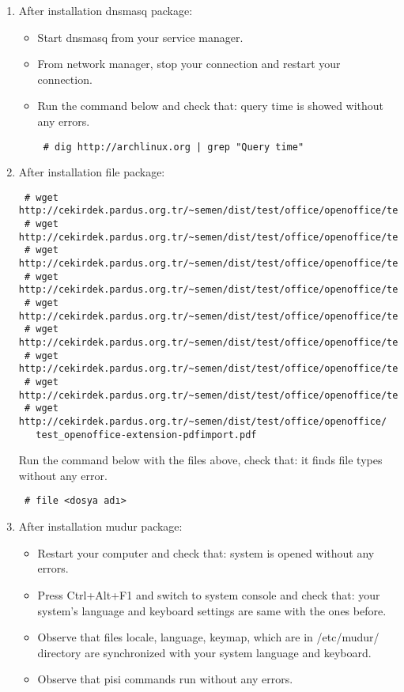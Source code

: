 \documentclass[a4paper,10pt]{article}
\begin{document}
\begin{enumerate}
\item After installation  dnsmasq package:

\begin{itemize}
 \item Start dnsmasq from your service manager.
 \item From network manager, stop your connection and restart your connection.
 \item Run the command below and  check that: query time is showed without any errors.
\begin{verbatim}
 # dig http://archlinux.org | grep "Query time"
\end{verbatim}

\end{itemize}


\item After installation  file package:

\begin{verbatim}
 # wget http://cekirdek.pardus.org.tr/~semen/dist/test/office/openoffice/test_oodraw.mng
 # wget http://cekirdek.pardus.org.tr/~semen/dist/test/office/openoffice/test_oodraw.odg
 # wget http://cekirdek.pardus.org.tr/~semen/dist/test/office/openoffice/test_oodraw.jpg
 # wget http://cekirdek.pardus.org.tr/~semen/dist/test/office/openoffice/test_oodraw.gif
 # wget http://cekirdek.pardus.org.tr/~semen/dist/test/office/openoffice/test_oodraw.png
 # wget http://cekirdek.pardus.org.tr/~semen/dist/test/office/openoffice/test_oodraw.tif
 # wget http://cekirdek.pardus.org.tr/~semen/dist/test/office/openoffice/test_oowriter.txt
 # wget http://cekirdek.pardus.org.tr/~semen/dist/test/office/openoffice/test_oodraw.ps
 # wget http://cekirdek.pardus.org.tr/~semen/dist/test/office/openoffice/
   test_openoffice-extension-pdfimport.pdf
\end{verbatim}

Run the command below with the files above, check that: it finds file types without any error.
\begin{verbatim}
 # file <dosya adı>
\end{verbatim}

\item After installation  mudur package:

\begin{itemize}
  \item Restart your computer and check that: system is opened without any errors.
 \item Press Ctrl+Alt+F1 and switch to system console and check that: your system's language and keyboard settings are same with the ones before.
  \item Observe that files locale, language, keymap, which are in /etc/mudur/ directory  are synchronized with your system language and keyboard.
 \item Observe that pisi commands run without any errors. 


\end{itemize}
\end{enumerate}
\end{document}
